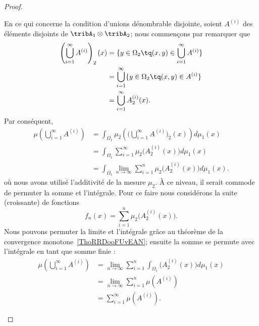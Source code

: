 \begin{proof}
\begin{subproof}
	En ce qui concerne la condition d'unions dénombrable disjointe, soient \( A^{(i)}\) des éléments disjoints de \( \tribA_1\otimes \tribA_2\); nous commençons par remarquer que
	\begin{subequations}
	\begin{align}
	\left( \bigcup_{i=1}^{\infty}A^{(i)} \right)_2(x) & =\{ y\in\Omega_2\tq (x,y)\in\bigcup_{i=1}^{\infty}A^{(i)} \}  \\
		& =\bigcup_{i=1}^{\infty}\{ y\in\Omega_2\tq (x,y)\in A^{(i)} \} \\
		& =\bigcup_{i=1}^{\infty}A^{(i)}_2(x).
		\end{align}
		\end{subequations}
		Par conséquent,
		\begin{subequations}
		\begin{align}
		\mu\left( \bigcup_{i=1}^{\infty}A^{(i)} \right) & =\int_{\Omega_1}\mu_2\left(    \Big( \bigcup_{i=1}^{\infty}A^{(i)} \Big)_2(x)     \right)d\mu_1(x) \\
			& =\int_{\Omega_1}\sum_{i=1}^{\infty}\mu_2\big( A^{(i)}_2(x) \big)d\mu_1(x)                          \\
			& =\int_{\Omega_1}\lim_{n\to \infty} \sum_{i=1}^{n}\mu_2\big( A^{(i)}_2(x) \big)d\mu_1(x).
			\end{align}
			\end{subequations}
			où nous avons utilisé l'additivité de la mesure \( \mu_2\). À ce niveau, il serait commode de permuter la somme et l'intégrale. Pour ce faire nous considérons la suite (croissante) de fonctions
			\begin{equation}
			f_n(x)=\sum_{i=1}^n\mu_2\big( A_2^{(i)}(x) \big).
			\end{equation}
			Nous pouvons permuter la limite et l'intégrale grâce au théorème de la convergence monotone~\ref{ThoRRDooFUvEAN}; ensuite la somme se permute avec l'intégrale en tant que somme finie :
			\begin{subequations}
			\begin{align}
			\mu\left( \bigcup_{i=1}^{\infty}A^{(i)} \right) & =\lim_{n\to \infty} \sum_{i=1}^n\int_{\Omega_1}\big( A_2^{(i)}(x) \big)d\mu_1(x) \\
				& =\lim_{n\to \infty} \sum_{i=1}^n\mu(A^{(i)})                                     \\
				& =\sum_{i=1}^{\infty}\mu( A^{(i)} ).
				\end{align}
				\end{subequations}


\end{subproof}
\end{proof}
